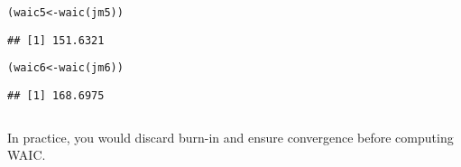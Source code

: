 \documentclass[color=usenames,dvipsnames]{beamer}\usepackage[]{graphicx}\usepackage[]{color}
\makeatletter
\newcommand{\hlstd}[1]{\textcolor[rgb]{0,0,0}{#1}}%
\newcommand{\hlkwb}[1]{\textcolor[rgb]{0,0.341,0.682}{#1}}%
\newcommand{\hlkwd}[1]{\textcolor[rgb]{0.004,0.004,0.506}{#1}}%
\newenvironment{kframe}{%
 \def\at@end@of@kframe{}%
 \ifinner\ifhmode%
  \def\at@end@of@kframe{\end{minipage}}%
  \begin{minipage}{\columnwidth}%
 \fi\fi%
 \def\FrameCommand##1{\hskip\@totalleftmargin \hskip-\fboxsep
 \colorbox{shadecolor}{##1}\hskip-\fboxsep
     \hskip-\linewidth \hskip-\@totalleftmargin \hskip\columnwidth}%
 \MakeFramed {\advance\hsize-\width
   \@totalleftmargin\z@ \linewidth\hsize
   \@setminipage}}%
 {\par\unskip\endMakeFramed%
 \at@end@of@kframe}
\newenvironment{knitrout}{}{} %
\makeatother
\begin{document}
\begin{frame}[fragile]
\begin{columns}
\begin{column}{0.5\textwidth}
\begin{knitrout}
\end{knitrout}
\begin{knitrout}\scriptsize
{}\color{fgcolor}\begin{kframe}
\begin{alltt}
\hlstd{(waic5} \hlkwb{<-} \hlkwd{waic}\hlstd{(jm5))}
\end{alltt}
\begin{verbatim}
## [1] 151.6321
\end{verbatim}
\end{kframe}
\end{knitrout}
\begin{knitrout}\scriptsize
{}\color{fgcolor}\begin{kframe}
\begin{alltt}
\hlstd{(waic6} \hlkwb{<-} \hlkwd{waic}\hlstd{(jm6))}
\end{alltt}
\begin{verbatim}
## [1] 168.6975
\end{verbatim}
\end{kframe}
\end{knitrout}
    \end{column}
  \end{columns}
  \pause
  \vfill
  In practice, you would discard burn-in and ensure convergence before
  computing WAIC.
\end{frame}
\end{document}
